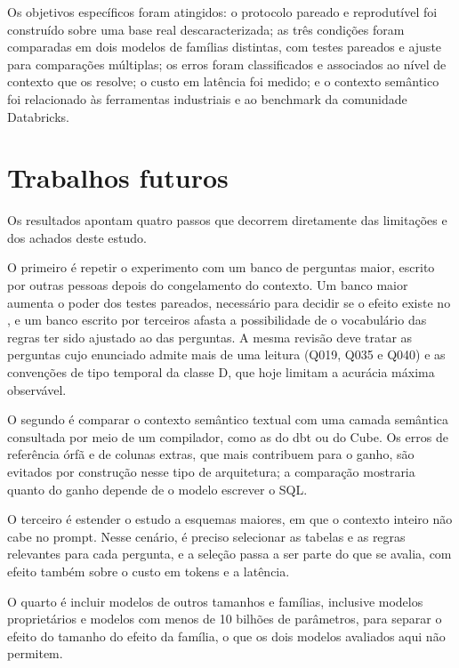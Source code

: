 Os objetivos específicos foram atingidos: o protocolo pareado e
reprodutível foi construído sobre uma base real descaracterizada; as três
condições foram comparadas em dois modelos de famílias distintas, com
testes pareados e ajuste para comparações múltiplas; os erros foram
classificados e associados ao nível de contexto que os resolve; o custo
em latência foi medido; e o contexto semântico foi relacionado às
ferramentas industriais e ao benchmark da comunidade Databricks.

\section{Trabalhos futuros}
\label{sec:trabalhos-futuros}

Os resultados apontam quatro passos que decorrem diretamente das
limitações e dos achados deste estudo.

O primeiro é repetir o experimento com um banco de perguntas maior,
escrito por outras pessoas depois do congelamento do contexto. Um banco
maior aumenta o poder dos testes pareados, necessário para decidir se o
efeito existe no , e um banco escrito por terceiros
afasta a possibilidade de o vocabulário das regras ter sido ajustado ao
das perguntas. A mesma revisão deve tratar as perguntas cujo enunciado
admite mais de uma leitura (Q019, Q035 e Q040) e as convenções de tipo
temporal da classe D, que hoje limitam a acurácia máxima observável.

O segundo é comparar o contexto semântico textual com uma camada
semântica consultada por meio de um compilador, como as do dbt ou do
Cube. Os erros de referência órfã e de colunas extras, que mais
contribuem para o ganho, são evitados por construção nesse tipo de
arquitetura; a comparação mostraria quanto do ganho depende de o modelo
escrever o SQL.

O terceiro é estender o estudo a esquemas maiores, em que o contexto
inteiro não cabe no prompt. Nesse cenário, é preciso selecionar as
tabelas e as regras relevantes para cada pergunta, e a seleção passa a
ser parte do que se avalia, com efeito também sobre o custo em tokens e
a latência.

O quarto é incluir modelos de outros tamanhos e famílias, inclusive
modelos proprietários e modelos com menos de 10 bilhões de parâmetros,
para separar o efeito do tamanho do efeito da família, o que os dois
modelos avaliados aqui não permitem.
